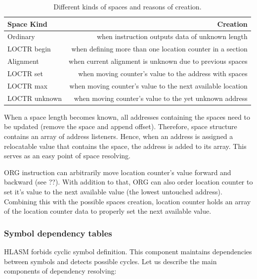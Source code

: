 \begin{table}
	\centering
	\begin{tabular}{lr}
		\textbf{Space Kind} &                                          \textbf{Creation} \\ \toprule
		Ordinary            &            when instruction outputs data of unknown length \\
		LOCTR begin         &  when defining more than one location counter in a section \\
		Alignment           &   when current alignment is unknown due to previous spaces \\
		LOCTR set           &     when moving counter's value to the address with spaces \\
		LOCTR max           & when moving counter's value to the next available location \\
		LOCTR unknown       &     when moving counter's value to the yet unknown address \\ \bottomrule
	\end{tabular}
	\caption{Different kinds of spaces and reasons of creation.}
	\label{tab06:space}
\end{table}


When a space length becomes known, all addresses containing the spaces need to be updated (remove the space and append offset). Therefore, space structure contains an array of address listeners. Hence, when an address is assigned a relocatable value that contains the space, the address is added to its array. This serves as an easy point of space resolving.

\vspace{0.5cm}

ORG instruction can arbitrarily move location counter's value forward and backward (see ??). With addition to that, ORG  can also order location counter to set it's value to the next available value (the lowest untouched address). Combining this with the possible spaces creation, location counter holds an array of the location counter data to properly set the next available value.

\subsubsection{Symbol dependency tables}

HLASM forbids cyclic symbol definition. This component maintains dependencies between symbols and detects possible cycles.
Let us describe the main components of dependency resolving:


